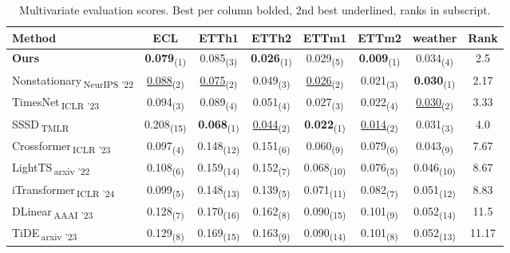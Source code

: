 \begin{table}[htbp]
\centering
\caption{Multivariate evaluation scores. Best per column bolded, 2nd best underlined, ranks in subscript.}
\begin{tabular}{l|cccccc|c}
\toprule
Method & ECL & ETTh1 & ETTh2 & ETTm1 & ETTm2 & weather & Rank \\
\midrule
\textbf{Ours} & \textbf{0.079}\textsubscript{(1)} & 0.085\textsubscript{(3)} & \textbf{0.026}\textsubscript{(1)} & 0.029\textsubscript{(5)} & \textbf{0.009}\textsubscript{(1)} & 0.034\textsubscript{(4)} & 2.5 \\
\midrule
Nonstationary\,\textsubscript{NeurIPS '22} & \underline{0.088}\textsubscript{(2)} & \underline{0.075}\textsubscript{(2)} & 0.049\textsubscript{(3)} & \underline{0.026}\textsubscript{(2)} & 0.021\textsubscript{(3)} & \textbf{0.030}\textsubscript{(1)} & 2.17 \\
TimesNet\,\textsubscript{ICLR '23} & 0.094\textsubscript{(3)} & 0.089\textsubscript{(4)} & 0.051\textsubscript{(4)} & 0.027\textsubscript{(3)} & 0.022\textsubscript{(4)} & \underline{0.030}\textsubscript{(2)} & 3.33 \\
SSSD\,\textsubscript{TMLR} & 0.208\textsubscript{(15)} & \textbf{0.068}\textsubscript{(1)} & \underline{0.044}\textsubscript{(2)} & \textbf{0.022}\textsubscript{(1)} & \underline{0.014}\textsubscript{(2)} & 0.031\textsubscript{(3)} & 4.0 \\
Crossformer\,\textsubscript{ICLR '23} & 0.097\textsubscript{(4)} & 0.148\textsubscript{(12)} & 0.151\textsubscript{(6)} & 0.060\textsubscript{(9)} & 0.079\textsubscript{(6)} & 0.043\textsubscript{(9)} & 7.67 \\
LightTS\,\textsubscript{arxiv '22} & 0.108\textsubscript{(6)} & 0.159\textsubscript{(14)} & 0.152\textsubscript{(7)} & 0.068\textsubscript{(10)} & 0.076\textsubscript{(5)} & 0.046\textsubscript{(10)} & 8.67 \\
iTransformer\,\textsubscript{ICLR '24} & 0.099\textsubscript{(5)} & 0.148\textsubscript{(13)} & 0.139\textsubscript{(5)} & 0.071\textsubscript{(11)} & 0.082\textsubscript{(7)} & 0.051\textsubscript{(12)} & 8.83 \\
DLinear\,\textsubscript{AAAI '23} & 0.128\textsubscript{(7)} & 0.170\textsubscript{(16)} & 0.162\textsubscript{(8)} & 0.090\textsubscript{(15)} & 0.101\textsubscript{(9)} & 0.052\textsubscript{(14)} & 11.5 \\
TiDE\,\textsubscript{arxiv '23} & 0.129\textsubscript{(8)} & 0.169\textsubscript{(15)} & 0.163\textsubscript{(9)} & 0.090\textsubscript{(14)} & 0.101\textsubscript{(8)} & 0.052\textsubscript{(13)} & 11.17 \\

\end{tabular}
\end{table}
